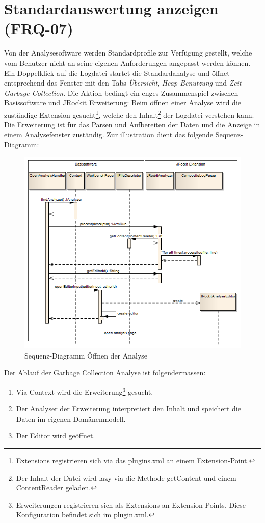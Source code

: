 \section{Standardauswertung anzeigen (FRQ-07)}
Von der Analysesoftware werden Standardprofile zur Verfügung gestellt, welche vom Benutzer nicht an seine eigenen Anforderungen angepasst werden können. Ein Doppelklick auf die Logdatei startet die Standardanalyse und öffnet entsprechend das Fenster mit den Tabs \textit{Übersicht}, \textit{Heap Benutzung} und \textit{Zeit Garbage Collection}. Die Aktion bedingt ein enges Zusammenspiel zwischen Basissoftware und JRockit Erweiterung: Beim öffnen einer Analyse wird die zuständige Extension gesucht\footnote{Extensions registrieren sich via das plugins.xml an einem Extension-Point. }, welche den Inhalt\footnote{Der Inhalt der Datei wird lazy via die Methode getContent und einem ContentReader geladen.} der Logdatei verstehen kann. Die Erweiterung ist für das Parsen und Aufbereiten der Daten und die Anzeige in einem Analysefenster zuständig. Zur illustration dient das folgende Sequenz-Diagramm:
 \begin{figure}[H]
  	\centering
    	\includegraphics[width=16cm]{images/core_sequence_analysis}
	\caption{Sequenz-Diagramm Öffnen der Analyse}
\end{figure}
Der Ablauf der Garbage Collection Analyse ist folgendermassen:
\begin{enumerate}
	\item Via Context wird die Erweiterung\footnote{Erweiterungen registrieren sich als Extensions an Extension-Points. Diese Konfiguration befindet sich im plugin.xml.} gesucht.
	\item Der Analyser der Erweiterung interpretiert den Inhalt und speichert die Daten im eigenen Domänenmodell.
	\item Der Editor wird geöffnet.
\end{enumerate}

